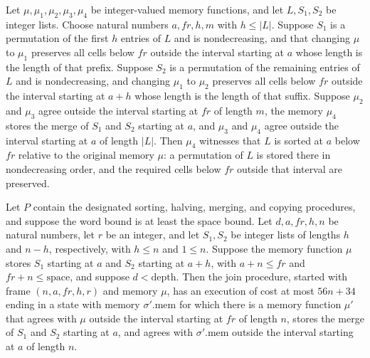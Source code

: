 \begin{theorem}
\label{Light.MergeSort.sorted_merge}
\leanok
{}
Let $\mu,\mu_1,\mu_2,\mu_3,\mu_4$ be integer-valued memory functions, and let
$L,S_1,S_2$ be integer lists. Choose natural numbers $a,fr,h,m$ with $h\le |L|$. Suppose
$S_1$ is a permutation of the first $h$ entries of $L$ and is nondecreasing, and that
changing $\mu$ to $\mu_1$ preserves all cells below $fr$ outside the interval starting
at $a$ whose length is the length of that prefix. Suppose $S_2$ is a permutation of the
remaining entries of $L$ and is nondecreasing, and changing $\mu_1$ to $\mu_2$ preserves
all cells below $fr$ outside the interval starting at $a+h$ whose length is the length
of that suffix. Suppose $\mu_2$ and $\mu_3$ agree outside the interval starting at $fr$
of length $m$, the memory $\mu_4$ stores the merge of $S_1$ and $S_2$ starting at $a$,
and $\mu_3$ and $\mu_4$ agree outside the interval starting at $a$ of length $|L|$. Then
$\mu_4$ witnesses that $L$ is sorted at $a$ below $fr$ relative to the original memory
$\mu$: a permutation of $L$ is stored there in nondecreasing order, and the required
cells below $fr$ outside that interval are preserved.
\end{theorem}

\begin{theorem}
\label{Light.MergeSort.join_ends}
\leanok
{}
Let $P$ contain the designated sorting, halving, merging, and copying procedures, and
suppose the word bound is at least the space bound. Let $d,a,fr,h,n$ be natural numbers,
let $r$ be an integer, and let $S_1,S_2$ be integer lists of lengths $h$ and $n-h$,
respectively, with $h\le n$ and $1\le n$. Suppose the memory function $\mu$ stores $S_1$
starting at $a$ and $S_2$ starting at $a+h$, with $a+n\le fr$ and
$fr+n\le\mathrm{space}$, and suppose $d<\mathrm{depth}$. Then the join procedure,
started with frame $(n,a,fr,h,r)$ and memory $\mu$, has an execution of cost at most
$56n+34$ ending in a state with memory $\sigma'.\mathrm{mem}$ for which there is a
memory function $\mu'$ that agrees with $\mu$ outside the interval starting at $fr$ of
length $n$, stores the merge of $S_1$ and $S_2$ starting at $a$, and agrees with
$\sigma'.\mathrm{mem}$ outside the interval starting at $a$ of length $n$.
\end{theorem}

